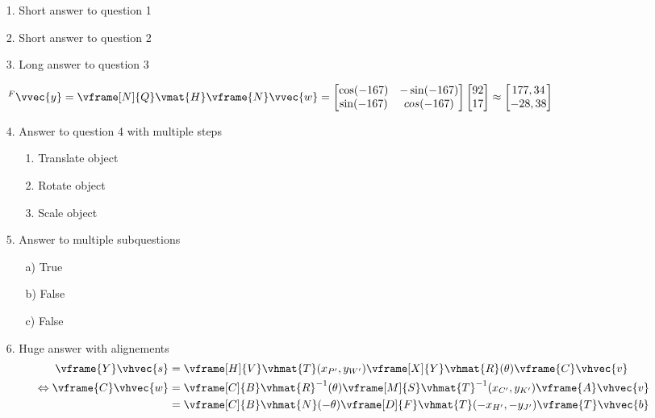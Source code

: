 \documentclass{gif7001}
\begin{document}
\vshort

\begin{enumerate}
    \item[1.] Short answer to question 1
    \item[2.] Short answer to question 2
    \item[3.] Long answer to question 3

    $^F\vvec{y} = \vframe[N]{Q}\vmat{H} \vframe{N}\vvec{w} = \begin{bmatrix} \cos(-167) & -\sin(-167) \\ \sin(-167) & cos(-167) \end{bmatrix} \begin{bmatrix} 92 \\ 17 \end{bmatrix} \approx \begin{bmatrix} 177,34 \\ -28,38 \end{bmatrix}$
    \item[4.] Answer to question 4 with multiple steps
    \begin{enumerate}
        \item[1.] Translate object
        \item[2.] Rotate object
        \item[3.] Scale object
    \end{enumerate}
    \item[5.] Answer to multiple subquestions
    \begin{enumerate}
        \item[a)] True
        \item[b)] False
        \item[c)] False
    \end{enumerate}
    \item[6.] Huge answer with alignements
          \begin{align*}
        \vframe{Y}\vhvec{s} &= \vframe[H]{V}\vhmat{T}(x_{P'},y_{W'}) \vframe[X]{Y}\vhmat{R}(\theta) \vframe{C}\vhvec{v} \\
        \Leftrightarrow \vframe{C}\vhvec{w} &= \vframe[C]{B}\vhmat{R}^{-1}(\theta) \vframe[M]{S}\vhmat{T}^{-1}(x_{C'},y_{K'}) \vframe{A}\vhvec{v} \\
        &= \vframe[C]{B}\vhmat{N}(-\theta) \vframe[D]{F}\vhmat{T}(-x_{H'},-y_{J'}) \vframe{T}\vhvec{b} \\

\end{align*}
\end{enumerate}
\end{document}
